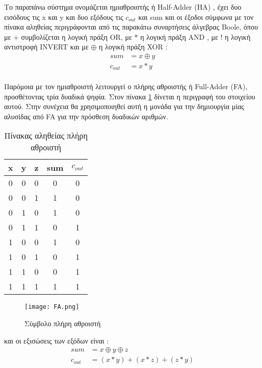 Το παραπάνω σύστημα ονομάζεται ημιαθροιστής ή Half-Adder (HA) , έχει δυο εισόδους τις x και y και δυο εξόδους τις $c_{out}$ και sum και οι έξοδοι σύμφωνα με τον πίνακα αληθείας περιγράφονται από τις παρακάτω συναρτήσεις άλγεβρας Boole, όπου με $+$ συμβολίζεται η λογική πράξη ΟR, με $*$ η λογική πράξη ΑΝD , με $!$ η λογική αντιστροφή INVERT και με $\oplus$ η λογική πράξη XOR :\\
\begin{equation}
\begin{split}
    sum &= x \oplus y \\ 
    c_{out} &= x * y
\end{split}
\end{equation}\\


Παρόμοια με τον ημιαθροιστή λειτουργεί ο πλήρης αθροιστής ή Full-Adder (FA), προσθέτοντας τρία δυαδικά ψηφία. Στον πίνακα \ref{table:2} δίνεται η περιγραφή του στοιχείου αυτού. Στην συνέχεια θα χρησιμοποιηθεί αυτή η μονάδα για την δημιουργία μίας αλυσίδας από FA για την πρόσθεση δυαδικών αριθμών.
\begin{multicols}{2}
\hfill
\begin{table}[H]
\centering
 \begin{tabular}{||c c c | c c||} 
 \hline
 x & y & z & sum & $c_{out}$ \\ [0.5ex] 
 \hline\hline
 0 & 0 & 0 & 0 & 0 \\ 
 \hline
 0 & 0 & 1 & 1 & 0 \\
 \hline
 0 & 1 & 0 & 1 & 0 \\
 \hline
 0 & 1 & 1 & 0 & 1 \\
 \hline
 1 & 0 & 0 & 1 & 0 \\ 
 \hline
 1 & 0 & 1 & 0 & 1 \\
 \hline
 1 & 1 & 0 & 0 & 1 \\
 \hline
 1 & 1 & 1 & 1 & 1 \\
 \hline
\end{tabular}
\caption{Πίνακας αληθείας πλήρη αθροιστή}
\label{table:2}
\end{table}
\begin{figure}[H]
\centering
\texttt{[image: FA.png]}
\caption{Σύμβολο πλήρη αθροιστή}
\label{FASchematic}
\end{figure}
\end{multicols}
και οι εξισώσεις των εξόδων είναι :
\begin{equation}
\begin{split}
    sum &= x \oplus y \oplus z \\
    c_{out} &= ( x * y ) + ( x * z ) + ( z * y )
\end{split}
\end{equation}





